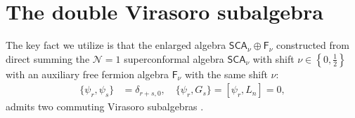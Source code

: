 \documentclass[12pt]{article}
\def\ie{\begin{equation}\begin{aligned}}
\def\fe{\end{aligned}\end{equation}}
\def\NS{\mathrm{NS}}
\def\R{\mathrm{R}}
\begin{document}

\section{The double Virasoro subalgebra}

\label{sec:2Vir}

The key fact we utilize is that the enlarged algebra $\mathsf{SCA}_\nu \oplus \mathsf{F}_{\nu}$ constructed from direct summing the $\mathcal{N}=1$ superconformal algebra $\mathsf{SCA}_\nu$ with shift $\nu\in \left\{0,\frac{1}{2}\right\}$ with an auxiliary free fermion algebra $\mathsf{F}_\nu$ with the same shift $\nu$:
\ie
\{\psi_r, \psi_s\} &= \delta_{r+s,0},\quad \{\psi_r, G_s\}=[\psi_r, L_n] = 0,
\fe
admits two commuting Virasoro subalgebras \cite{Belavin:2011sw,Hadasz:2013dza,Bershtein:2014yia,Bershtein:2016uov}. 
\end{document}
